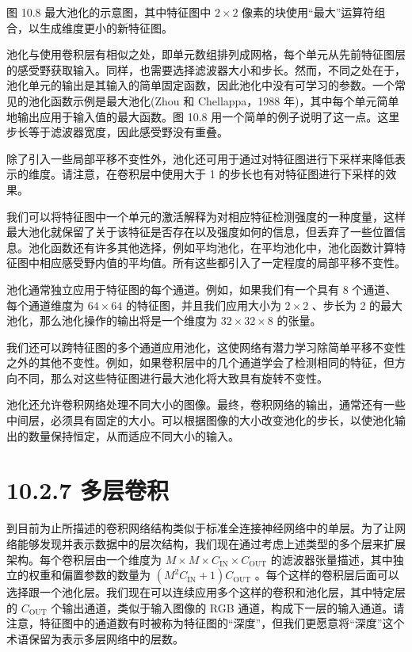 \documentclass[10pt]{article}
\begin{document}
图 10.8 最大池化的示意图，其中特征图中 \(2 \times  2\) 像素的块使用“最大”运算符组合，以生成维度更小的新特征图。

池化与使用卷积层有相似之处，即单元数组排列成网格，每个单元从先前特征图层的感受野获取输入。同样，也需要选择滤波器大小和步长。然而，不同之处在于，池化单元的输出是其输入的简单固定函数，因此池化中没有可学习的参数。一个常见的池化函数示例是最大池化(Zhou 和 Chellappa，1988 年)，其中每个单元简单地输出应用于输入值的最大函数。图 10.8 用一个简单的例子说明了这一点。这里步长等于滤波器宽度，因此感受野没有重叠。

除了引入一些局部平移不变性外，池化还可用于通过对特征图进行下采样来降低表示的维度。请注意，在卷积层中使用大于 1 的步长也有对特征图进行下采样的效果。

我们可以将特征图中一个单元的激活解释为对相应特征检测强度的一种度量，这样最大池化就保留了关于该特征是否存在以及强度如何的信息，但丢弃了一些位置信息。池化函数还有许多其他选择，例如平均池化，在平均池化中，池化函数计算特征图中相应感受野内值的平均值。所有这些都引入了一定程度的局部平移不变性。

池化通常独立应用于特征图的每个通道。例如，如果我们有一个具有 8 个通道、每个通道维度为 \({64} \times  {64}\) 的特征图，并且我们应用大小为 \(2 \times  2\) 、步长为 2 的最大池化，那么池化操作的输出将是一个维度为 \({32} \times  {32} \times  8\) 的张量。

我们还可以跨特征图的多个通道应用池化，这使网络有潜力学习除简单平移不变性之外的其他不变性。例如，如果卷积层中的几个通道学会了检测相同的特征，但方向不同，那么对这些特征图进行最大池化将大致具有旋转不变性。

池化还允许卷积网络处理不同大小的图像。最终，卷积网络的输出，通常还有一些中间层，必须具有固定的大小。可以根据图像的大小改变池化的步长，以使池化输出的数量保持恒定，从而适应不同大小的输入。

\section*{10.2.7 多层卷积}

到目前为止所描述的卷积网络结构类似于标准全连接神经网络中的单层。为了让网络能够发现并表示数据中的层次结构，我们现在通过考虑上述类型的多个层来扩展架构。每个卷积层由一个维度为 \(M \times  M \times  {C}_{\mathrm{{IN}}} \times  {C}_{\mathrm{{OUT}}}\) 的滤波器张量描述，其中独立的权重和偏置参数的数量为 \(\left( {{M}^{2}{C}_{\mathrm{{IN}}} + 1}\right) {C}_{\mathrm{{OUT}}}\) 。每个这样的卷积层后面可以选择跟一个池化层。我们现在可以连续应用多个这样的卷积和池化层，其中特定层的 \({C}_{\mathrm{{OUT}}}\) 个输出通道，类似于输入图像的 RGB 通道，构成下一层的输入通道。请注意，特征图中的通道数有时被称为特征图的“深度”，但我们更愿意将“深度”这个术语保留为表示多层网络中的层数。
\end{document}
